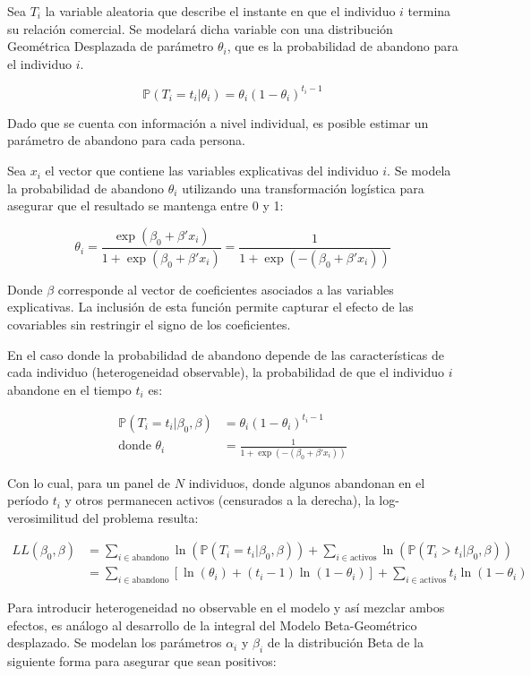 \documentclass[
]{book}
\begin{document}
Sea \(T_i\) la variable aleatoria que describe el instante en que el
individuo \(i\) termina su relación comercial. Se modelará dicha variable
con una distribución Geométrica Desplazada de parámetro \(\theta_i\), que
es la probabilidad de abandono para el individuo \(i\).

\[\mathbb{P}(T_i=t_i|\theta_i) = \theta_i(1-\theta_i)^{t_i-1}\]

Dado que se cuenta con información a nivel individual, es posible
estimar un parámetro de abandono para cada persona.

Sea \(x_i\) el vector que contiene las variables explicativas del
individuo \(i\). Se modela la probabilidad de abandono \(\theta_i\)
utilizando una transformación logística para asegurar que el resultado
se mantenga entre 0 y 1:

\[\theta_i = \frac{\exp(\beta_0 + \beta'x_i)}{1 + \exp(\beta_0 + \beta'x_i)} = \frac{1}{1 + \exp(-(\beta_0 + \beta'x_i))}\]

Donde \(\beta\) corresponde al vector de coeficientes asociados a las
variables explicativas. La inclusión de esta función permite capturar el
efecto de las covariables sin restringir el signo de los coeficientes.

En el caso donde la probabilidad de abandono depende de las
características de cada individuo (heterogeneidad observable), la
probabilidad de que el individuo \(i\) abandone en el tiempo \(t_i\) es:

\[
\begin{aligned}
\mathbb{P}(T_i = t_i|\beta_0, \beta) &= \theta_i (1 - \theta_i)^{t_i-1} \\
\text{donde } \theta_i &= \frac{1}{1 + \exp(-(\beta_0 + \beta'x_i))}
\end{aligned}
\]

Con lo cual, para un panel de \(N\) individuos, donde algunos abandonan en
el período \(t_i\) y otros permanecen activos (censurados a la derecha),
la log-verosimilitud del problema resulta:

\[
\begin{aligned}
LL(\beta_0, \beta) &= \sum_{i \in \text{abandono}} \ln(\mathbb{P}(T_i = t_i|\beta_0, \beta)) + \sum_{i \in \text{activos}} \ln(\mathbb{P}(T_i > t_i|\beta_0, \beta)) \\
&= \sum_{i \in \text{abandono}} \left[ \ln(\theta_i) + (t_i-1)\ln(1-\theta_i) \right] + \sum_{i \in \text{activos}} t_i \ln(1-\theta_i)
\end{aligned}
\]

Para introducir heterogeneidad no observable en el modelo y así mezclar
ambos efectos, es análogo al desarrollo de la integral del Modelo
Beta-Geométrico desplazado. Se modelan los parámetros \(\alpha_i\) y
\(\beta_i\) de la distribución Beta de la siguiente forma para asegurar
que sean positivos:
\end{document}
